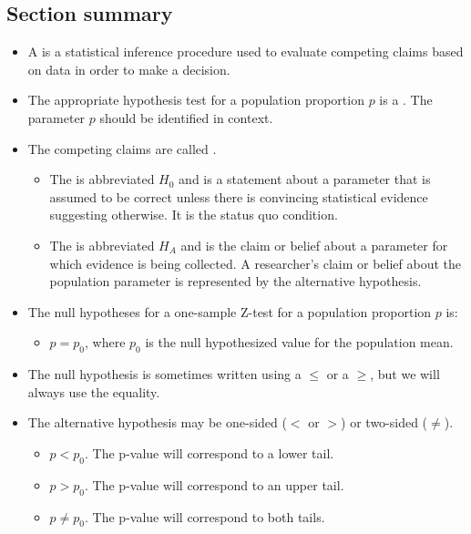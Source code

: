 \newpage	

\subsection*{Section summary}

\begin{itemize} 

\item A  is a statistical inference procedure used to evaluate competing claims based on data in order to make a decision.

\item The appropriate hypothesis test for a population proportion $p$ is a 
.  The parameter $p$ should be identified in context.

\item The competing claims are called .   \vspace{-1mm}
\begin{itemize}
\item The  is abbreviated $H_0$ and is a statement
about a parameter that is assumed to be correct unless there is convincing
statistical evidence suggesting otherwise. It is the status quo condition.
\item The  is abbreviated $H_A$ and is the claim or belief about a parameter for which evidence is being collected. A researcher’s claim or belief about the population parameter is represented by the alternative hypothesis.
\end{itemize}

\item The null hypotheses for a one-sample Z-test for a population proportion $p$ is:  
\begin{itemize}
\setlength{\itemindent}{3mm}
\item[$H_0$:] $p=p_0$, where $p_0$ is the null hypothesized value for the population mean.
\end{itemize}
\item[]The null hypothesis is sometimes written using a $\le$ or a $\ge$, but we will always use the equality.


\item The alternative hypothesis may be one-sided ($<$ or $>$) or two-sided ($\ne$).
\begin{itemize}
\setlength{\itemindent}{3mm}
\item[$H_A$:] $p<p_0$.  The p-value will correspond to a lower tail.
\item[$H_A$:] $p>p_0$.   The p-value will correspond to an upper tail.
\item[$H_A$:]$p\ne p_0$.  The p-value will correspond to both tails.
\end{itemize}


\end{itemize}
